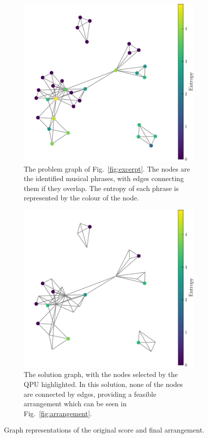 \documentclass[aps,pra,10pt,twocolumn]{revtex4-2}
\begin{document}
\begin{figure}[!t]
    \centering
    \begin{subfigure}[b]{0.5\linewidth}
        \includegraphics[width=0.9\linewidth]{../Figures/problemGraph.pdf}
        \caption{The problem graph of Fig.\ \ref{fig:excerpt}. The nodes are the identified musical phrases, with edges connecting them if they overlap. The entropy of each phrase is represented by the colour of the node.}
        \label{fig:problem-graph}
    \end{subfigure}\hfill
    \begin{subfigure}[b]{0.5\linewidth}
        \includegraphics[width=0.9\linewidth]{../Figures/solutionGraph.pdf}
        \caption{The solution graph, with the nodes selected by the QPU highlighted. In this solution, none of the nodes are connected by edges, providing a feasible arrangement which can be seen in Fig.\ \ref{fig:arrangement}.}
        \label{fig:solution-graph}
    \end{subfigure}
    \caption{Graph representations of the original score and final arrangement.}
    \label{fig:graphs}
\end{figure}
\end{document}
